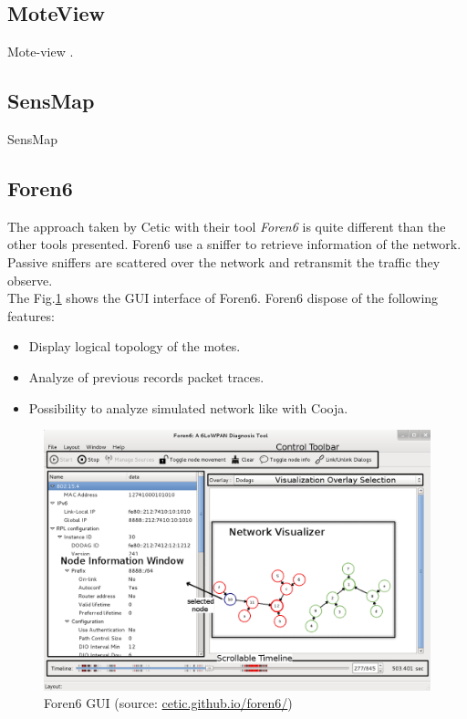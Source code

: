 \subsection{MoteView}

Mote-view \cite{turon2005mote}.

\subsection{SensMap}

SensMap \cite{mraz2014visualization}

\subsection{Foren6}

The approach taken by Cetic with their tool \textit{Foren6} \cite{website:foren6} is quite different than the other tools presented. Foren6 use a sniffer to retrieve information of the network. Passive sniffers are scattered over the network and retransmit the traffic they observe. \\

The Fig.\ref{fig:foren6} shows the GUI interface of Foren6. Foren6 dispose of the following features:
\begin{itemize}
  \item Display logical topology of the motes.
  \item Analyze of previous records packet traces.
  \item Possibility to analyze simulated network like with Cooja. \\
\end{itemize}

\begin{figure}
  \centering
  \includegraphics[width=\textwidth]{res/foren6.png}
  \caption{Foren6 GUI (source: \url{cetic.github.io/foren6/})}
  \label{fig:foren6}
\end{figure}

